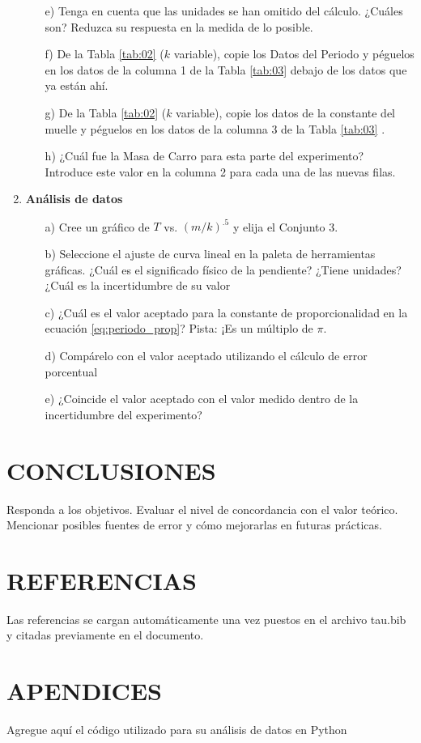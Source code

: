\documentclass[9pt,a4paper,twocolumn,twoside]{tau-class/tau}
\begin{document}
\begin{enumerate}
\begin{itemize}
            \item [e)]   Tenga  en  cuenta  que  las  unidades  se  han  omitido  del  cálculo.  ¿Cuáles  son?  Reduzca  su  respuesta en  la  medida  de  lo  posible.
            \item [f)] De la Tabla \textcolor{blue}{\ref{tab:02}} ($k$ variable), copie los Datos del Periodo y péguelos en los datos de la columna 1 de la Tabla \textcolor{blue}{\ref{tab:03}} debajo de los datos que ya están ahí.
            \item [g)]   De la Tabla \textcolor{blue}{\ref{tab:02}} ($k$ variable), copie los datos de la constante del muelle y péguelos en los datos de la columna 3 de la Tabla \textcolor{blue}{\ref{tab:03}} .
            \item[h)]  ¿Cuál fue la Masa de Carro para esta parte del experimento? Introduce este valor en la columna 2 para cada una de las nuevas filas.
        \end{itemize}
    \item \textbf{Análisis de datos}
        \begin{itemize}
            \item[a)]    Cree  un  gráfico  de  $T$  vs.  $(m/k)^.5$  y  elija  el  Conjunto  3.
            \item[b)]    Seleccione  el  ajuste  de  curva  lineal  en  la  paleta  de  herramientas  gráficas.  ¿Cuál  es  el  significado  físico  de  la  pendiente?  ¿Tiene  unidades?  ¿Cuál  es  la  incertidumbre  de  su  valor
            \item[c)]    ¿Cuál  es  el  valor  aceptado  para  la  constante  de  proporcionalidad  en  la  ecuación  \textcolor{blue}{\ref{eq:periodo_prop}}?  Pista:  ¡Es  un  múltiplo  de  $\pi$.
            \item[d)]  Compárelo  con  el  valor  aceptado  utilizando  el  cálculo  de  error  porcentual
            \item [e)]  ¿Coincide el valor aceptado con el valor medido dentro de la incertidumbre del experimento?
        \end{itemize}
\end{enumerate}
\section{CONCLUSIONES}
Responda a los objetivos. Evaluar el nivel de concordancia con el valor teórico. Mencionar posibles fuentes de error y cómo mejorarlas en futuras prácticas.
\section{REFERENCIAS}
Las referencias se cargan automáticamente una vez puestos en el archivo tau.bib y citadas previamente en el documento.


\section{APENDICES}
Agregue aquí el código utilizado para su análisis de datos en Python
\end{document}
